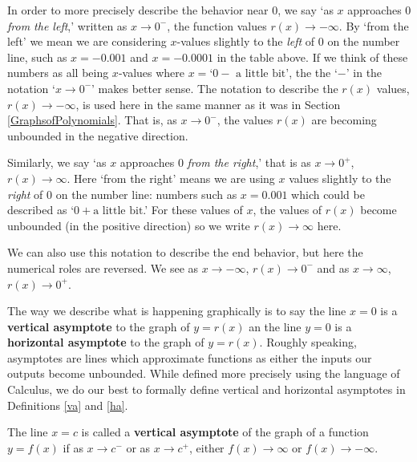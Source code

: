 In order to more precisely describe the behavior near $0$, we say `as $x$ approaches $0$ \textit{from the left},' written as $x \rightarrow 0^{-}$, the function values $r(x) \rightarrow -\infty$. By `from the left' we mean we are considering $x$-values slightly to the \textit{left} of $0$ on the number line, such as   $x = -0.001$ and $x = -0.0001$ in the table above. If we think of these numbers as all being $x$-values where  $x  = \text{`$0-$ a little bit'}$, the  the `$-$' in the notation `$x \rightarrow 0^{-}$' makes better sense.  The notation to describe the $r(x)$ values, $r(x) \rightarrow -\infty$, is used here in the same manner as it was in Section \ref{GraphsofPolynomials}.  That is, as  $x \rightarrow 0^{-}$,   the values $r(x)$ are becoming unbounded in the negative direction.  

Similarly, we say `as $x$ approaches $0$ \textit{from the right},' that is as $x \rightarrow 0^{+}$, $r(x) \rightarrow \infty$.  Here `from the right' means we are using $x$ values slightly to the \textit{right} of $0$ on the number line:  numbers such as $x =0.001$ which could be described as `$0 + \text{a little bit}$.'   For these values of $x$, the values of $r(x)$ become unbounded (in the positive direction) so we write $r(x)  \rightarrow \infty$ here. 

We can also use this notation to describe the end behavior, but here the numerical roles are reversed.  We see as $x \rightarrow -\infty$, $r(x) \rightarrow 0^{-}$ and as $x \rightarrow \infty$, $r(x) \rightarrow 0^{+}$.

The way we describe what is happening graphically is to say the line $x = 0$ is a  \textbf{vertical asymptote}  to the graph of $y = r(x)$ an the line $y = 0$ is a \textbf{horizontal asymptote} to the graph of $y = r(x)$.  Roughly speaking, asymptotes are lines which approximate functions as either the inputs our outputs become unbounded.  While defined more precisely using the language of Calculus, we do our best to formally define vertical and horizontal asymptotes in Definitions \ref{va} and \ref{ha}.

\begin{mdefn} \label{va} The line $x=c$ is called a \textbf{vertical asymptote} of the graph of a function $y=f(x)$ if as $x \rightarrow c^{-}$ or as $x \rightarrow c^{+}$, either $f(x) \rightarrow \infty$ or $f(x) \rightarrow -\infty$.

\end{mdefn}


